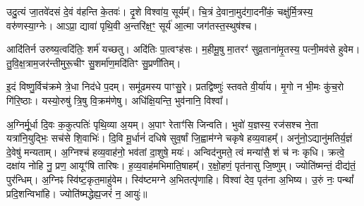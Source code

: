 उदु॒त्यं जा॒तवे॑दसं दे॒वं व॑हन्ति के॒तवः॑। दृ॒शे विश्वा॑य॒ सूर्यम्᳚।
चि॒त्रं दे॒वाना॒मुद॑गा॒दनी॑कं॒ चक्षु॑र्मि॒त्रस्य॒ वरु॑णस्या॒ग्नेः।
आऽप्रा॒ द्यावा॑ पृथि॒वी अ॒न्तरि॑क्ष॒ꣳ॒ सूर्य॑ आ॒त्मा जग॑तस्त॒स्थुष॑श्च।


आदि॑तिर्न उरुष्य॒त्वदि॑तिः॒ शर्म॑ यच्छतु। अदि॑तिः पा॒त्वꣳह॑सः।
म॒हीमू॒षु मा॒तरꣳ॑ सुव्र॒ताना॑मृ॒तस्य॒ पत्नी॒मव॑से हुवेम।
तु॒वि॒क्ष॒त्राम॒जर॑न्तीमुरू॒चीꣳ सु॒शर्मा॑ण॒\-मदि॑तिꣳ सु॒प्रणी॑तिम्।


इ॒दं विष्णु॒र्विच॑क्रमे त्रे॒धा निद॑धे प॒दम्। समू॑ढमस्य पाꣳसु॒रे।
प्रतद्विष्णुः॑ स्तवते वी॒र्या॑य। मृ॒गो न भी॒मः कु॑च॒रो गि॑रि॒ष्ठाः।
यस्यो॒रुषु॑ त्रि॒षु वि॒क्रम॑णेषु। अधि॑क्षि॒यन्ति॒ भुव॑नानि॒ विश्वा᳚।

अ॒ग्निर्मू॒र्धा दि॒वः क॒कुत्पतिः॑ पृथि॒व्या अ॒यम्। अ॒पाꣳ रेताꣳ॑सि जिन्वति।
भुवो॑ य॒ज्ञस्य॒ रज॑सश्च ने॒ता यत्रा॑नि॒युद्भिः॒ सच॑से शि॒वाभिः॑।
दि॒वि मू॒र्धानं॑ दधिषे सुव॒र्\mbox{}षां जि॒ह्वाम॑ग्ने चकृषे हव्य॒वाहम्᳚।
अनु॑नो॒ऽद्यानु॑मतिर्य॒ज्ञं दे॒वेषु॑ मन्यताम्।
अ॒ग्निश्च॑ हव्य॒वाह॑नो॒ भव॑तां दा॒शुषे॒ मयः॑।
अन्विद॑नुमते॒ त्वं मन्या॑सै॒ शं च॑ नः कृधि।
क्रत्वे॒ दक्षा॑य नोहि नु॒ प्रण॒ आयूꣳ॑षि तारिषः।
ह॒व्य॒वाह॑मभिमाति॒षाहम्᳚। र॒क्षो॒हणं॒ पृत॑नासु जि॒ष्णुम्।
ज्योति॑ष्मन्तं॒ दीद्य॑तं॒ पुर॑न्धिम्। अ॒ग्निꣴ स्वि॑ष्ट॒कृत॒माहु॑वेम।
स्वि॑ष्टमग्ने अ॒भितत्पृ॑णाहि। विश्वा॑ देव॒ पृत॑ना अ॒भिष्य।
उ॒रुं नः॒ पन्थां᳚ प्रदि॒शन्विभा॑हि। ज्योति॑ष्मद्धेह्य॒जरं॑ न॒ आयुः॑॥

